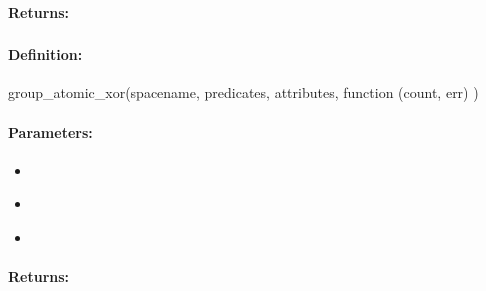 \paragraph{Returns:}


\pagebreak
\subsubsection{}
\label{api:nodejs:group_atomic_xor}


\paragraph{Definition:}
\begin{javascriptcode}
group_atomic_xor(spacename, predicates, attributes, function (count, err) {})
\end{javascriptcode}
\paragraph{Parameters:}
\begin{itemize}[noitemsep]
\item {}\\

\item {}\\

\item {}\\

\end{itemize}

\paragraph{Returns:}


\pagebreak
\subsubsection{}
\label{api:nodejs:atomic_xor}


